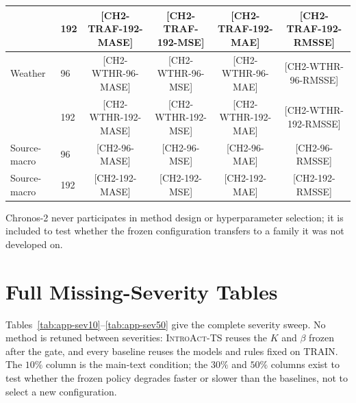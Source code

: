 \documentclass{article}
\newcommand{\ph}[1]{\textcolor{phgray}{\textsf{[#1]}}}
\newcommand{\introact}{\textsc{IntroAct-TS}}
\begin{document}
\begin{table}[h]
{\begin{tabular}{llcccc}
     & 192 & \ph{CH2-TRAF-192-MASE} & \ph{CH2-TRAF-192-MSE} & \ph{CH2-TRAF-192-MAE} & \ph{CH2-TRAF-192-RMSSE} \\
    \midrule
    Weather & 96 & \ph{CH2-WTHR-96-MASE} & \ph{CH2-WTHR-96-MSE} & \ph{CH2-WTHR-96-MAE} & \ph{CH2-WTHR-96-RMSSE} \\
     & 192 & \ph{CH2-WTHR-192-MASE} & \ph{CH2-WTHR-192-MSE} & \ph{CH2-WTHR-192-MAE} & \ph{CH2-WTHR-192-RMSSE} \\
    \midrule
    \rowcolor{bestgray}Source-macro & 96  & \ph{CH2-96-MASE} & \ph{CH2-96-MSE} & \ph{CH2-96-MAE} & \ph{CH2-96-RMSSE} \\
    \rowcolor{bestgray}Source-macro & 192 & \ph{CH2-192-MASE} & \ph{CH2-192-MSE} & \ph{CH2-192-MAE} & \ph{CH2-192-RMSSE} \\
    \bottomrule
  \end{tabular}}
\end{table}

Chronos-2 never participates in method design or hyperparameter selection; it is included to test whether the frozen configuration transfers to a family it was not developed on.

\section{Full Missing-Severity Tables}
\label{app:severity}
Tables~\ref{tab:app-sev10}--\ref{tab:app-sev50} give the complete severity sweep. No method
is retuned between severities: \introact{} reuses the $K$ and $\beta$ frozen after the
gate, and every baseline reuses the models and rules fixed on TRAIN. The $10\%$ column is
the main-text condition; the $30\%$ and $50\%$ columns exist to test whether the frozen
policy degrades faster or slower than the baselines, not to select a new configuration.
\end{document}
